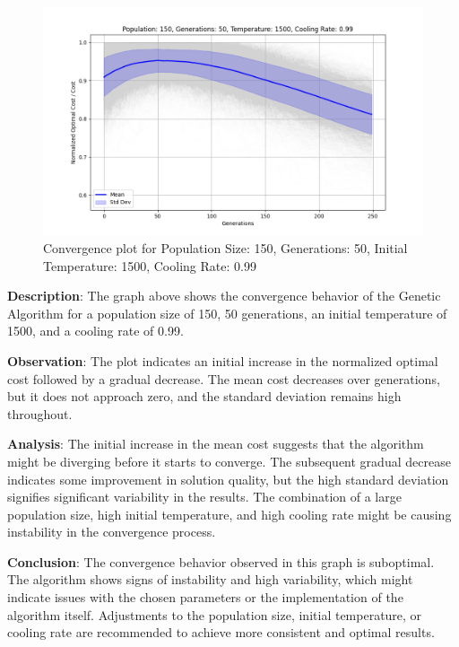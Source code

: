 \documentclass[
]{article}
\begin{document}
    \begin{figure}[H]
        \centering
        \includegraphics[width=\textwidth]{genetic_simulated_annealing_hybrid/Population_150_Generations_50_Temperature_1500_CoolingRate_0.99}
        \caption{Convergence plot for Population Size: 150, Generations: 50, Initial Temperature: 1500, Cooling Rate: 0.99}
        \label{fig:pop150_gen50_temp1500_cr0.99}
    \end{figure}

    \textbf{Description}: The graph above shows the convergence behavior of the Genetic Algorithm for a population size of 150, 50 generations, an initial temperature of 1500, and a cooling rate of 0.99.

    \textbf{Observation}: The plot indicates an initial increase in the normalized optimal cost followed by a gradual decrease. The mean cost decreases over generations, but it does not approach zero, and the standard deviation remains high throughout.

    \textbf{Analysis}: The initial increase in the mean cost suggests that the algorithm might be diverging before it starts to converge. The subsequent gradual decrease indicates some improvement in solution quality, but the high standard deviation signifies significant variability in the results. The combination of a large population size, high initial temperature, and high cooling rate might be causing instability in the convergence process.

    \textbf{Conclusion}: The convergence behavior observed in this graph is suboptimal. The algorithm shows signs of instability and high variability, which might indicate issues with the chosen parameters or the implementation of the algorithm itself. Adjustments to the population size, initial temperature, or cooling rate are recommended to achieve more consistent and optimal results.
\end{document}
